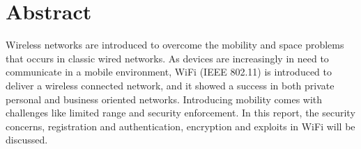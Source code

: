\chapter*{Abstract}
\label{chap:abstract}

Wireless networks are introduced to overcome the mobility and space problems that occurs in classic
wired networks.\cite{wifi_what_next} As devices are increasingly in need to communicate in a mobile
environment, WiFi (IEEE 802.11) is introduced to deliver a wireless connected network, and it showed a
success in both private personal and business oriented networks.\cite{gast_2005} Introducing mobility
comes with challenges like limited range and security enforcement.\cite{gast_2005} In this report, the
security concerns, registration and authentication, encryption and exploits in WiFi will be discussed.
